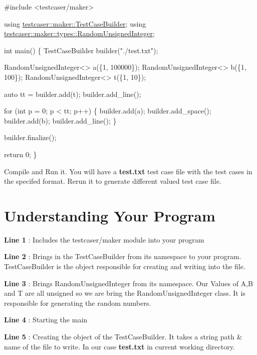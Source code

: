\begin{DoxyCode}
\textcolor{preprocessor}{#include <testcaser/maker>}

\textcolor{keyword}{using} \hyperlink{classtestcaser_1_1maker_1_1TestCaseBuilder}{testcaser::maker::TestCaseBuilder};
\textcolor{keyword}{using} \hyperlink{classtestcaser_1_1maker_1_1types_1_1RandomUnsignedInteger}{testcaser::maker::types::RandomUnsignedInteger};

\textcolor{keywordtype}{int} main() \{
TestCaseBuilder builder(\textcolor{stringliteral}{"./test.txt"});

RandomUnsignedInteger<> a(\{1, 100000\});
RandomUnsignedInteger<> b(\{1, 100\});
RandomUnsignedInteger<> t(\{1, 10\});

\textcolor{keyword}{auto} tt = builder.add(t);
builder.add\_line();

\textcolor{keywordflow}{for} (\textcolor{keywordtype}{int} p = 0; p < tt; p++) \{
  builder.add(a);
  builder.add\_space();
  builder.add(b);
  builder.add\_line();
\}

builder.finalize();

\textcolor{keywordflow}{return} 0;
\}
\end{DoxyCode}


Compile and Run it. You will have a {\bfseries test.\+txt} test case file with the test cases in the specifed format. Rerun it to generate different valued test case file. 

\hypertarget{index_under_standing}{}\section{Understanding Your Program}\label{index_under_standing}
{\bfseries Line 1} \+: Includes the {\ttfamily testcaser/maker} module into your program

{\bfseries Line 2} \+: Brings in the Test\+Case\+Builder from its namespace to your program. Test\+Case\+Builder is the object responsible for creating and writing into the file.

{\bfseries Line 3} \+: Brings Random\+Unsigned\+Integer from its namespace. Our Values of A,B and T are all unsigned so we are bring the Random\+Unsigned\+Integer class. It is responsible for generating the random numbers.

{\bfseries Line 4 } \+: Starting the main

{\bfseries Line 5 } \+: Creating the object of the Test\+Case\+Builder. It takes a string path \& name of the file to write. In our case {\bfseries test.\+txt} in current working directory.

